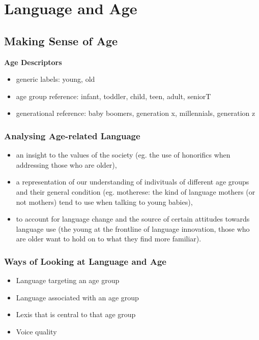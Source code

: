 \documentclass[../main.tex]{subfiles}
\begin{document}
\section{Language and Age}

\subsection{Making Sense of Age}
\textbf{Age Descriptors} \begin{itemize}
	\item generic labels: young, old
	\item age group reference: infant, toddler, child, teen, adult, seniorT \item generational reference: baby boomers, generation x, millennials, generation z
\end{itemize}

\subsubsection{Analysing Age-related Language}
\begin{itemize}
	\item an insight to the values of the society (eg. the use of honorifics when addressing those who are older),
	\item a representation of our understanding of indivituals of different age groups and their general condition (eg. motherese: the kind of language mothers (or not mothers) tend to use when talking to young babies),
	\item to account for language change and the source of certain attitudes towards language use (the young at the frontline of language innovation, those who are older want to hold on to what they find more familiar). 
\end{itemize}

\subsubsection{Ways of Looking at Language and Age}
\begin{itemize}
	\item Language targeting an age group
	\item Language associated with an age group
	\item Lexis that is central to that age group
	\item Voice quality
\end{itemize}
\end{document}
